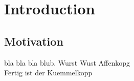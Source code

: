 \chapter{Introduction}
\section{Motivation}
bla bla bla \cite{Wang2008Factoring} blub.
\cite{Mairal2010Online} Wurst Wust Affenkopg \\
Fertig ist der Kuemmelkopp
